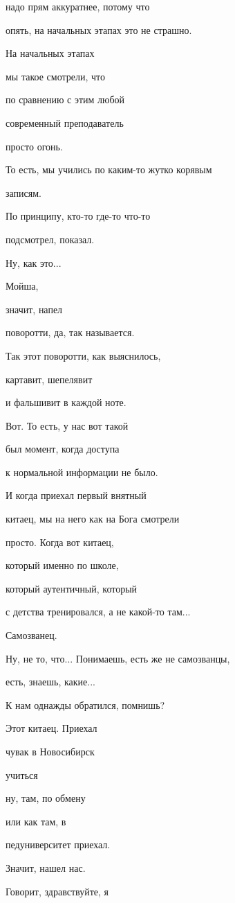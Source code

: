 надо прям аккуратнее, потому что

опять, на начальных этапах это не страшно.

На начальных этапах

мы такое смотрели, что

по сравнению с этим любой

современный преподаватель

просто огонь.

То есть, мы учились по каким-то жутко корявым

записям.

По принципу, кто-то где-то что-то

подсмотрел, показал.

Ну, как это...

Мойша,

значит, напел

поворотти, да, так называется.

Так этот поворотти, как выяснилось,

картавит, шепелявит

и фальшивит в каждой ноте.

Вот. То есть, у нас вот такой

был момент, когда доступа

к нормальной информации не было.

И когда приехал первый внятный

китаец, мы на него как на Бога смотрели

просто. Когда вот китаец,

который именно по школе,

который аутентичный, который

с детства тренировался, а не какой-то там...

Самозванец.

Ну, не то, что... Понимаешь, есть же не самозванцы,

есть, знаешь, какие...

К нам однажды обратился, помнишь?

Этот китаец. Приехал

чувак в Новосибирск

учиться

ну, там, по обмену

или как там, в

педуниверситет приехал.

Значит, нашел нас.

Говорит, здравствуйте, я

